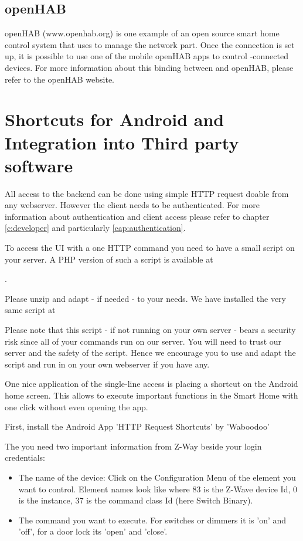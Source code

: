 \subsection{openHAB}

openHAB (www.openhab.org) is one example of an open source smart home control system that 
uses \zway to manage the \zwave network part. Once the connection is set up, it is possible 
to use one of the mobile openHAB apps to control \zway-connected devices. For more information 
about this binding between \zway and openHAB, please refer to the openHAB website.

\section {Shortcuts for Android and Integration into Third party software}

All access to the \zway backend can be done using simple HTTP request doable from any 
webserver. However the client needs to be authenticated. For more information about 
authentication and client access please refer to chapter \ref{c:developer} and 
particularly \ref{cap:authentication}.

To access the UI with a one HTTP command you need to have a small script on your server.
A PHP version of such a script is available at

.

Please unzip and adapt - if needed - to your needs. We have installed the very same script at


Please note that this script - if not running on your own server - bears a security risk 
since all of your commands run on our server. You will need to trust our server and the safety
of the script. Hence we encourage you to use and adapt the script and run in on your own
webserver if you have any.

One nice application of the single-line access is placing a shortcut on the Android 
home screen. This allows to execute important functions in the Smart Home with one click 
without even opening the app.

First, install the Android App 'HTTP Request Shortcuts' by 'Waboodoo'


The you need two important information from Z-Way beside your login credentials:
\begin{itemize}
\item The name of the device: Click on the Configuration Menu of the element you want to 
control. Element names look like  where 83 is the Z-Wave device
Id, 0 is the instance, 37 is the command class Id (here Switch Binary).

\item The command you want to execute. For switches or dimmers it is 'on' and 'off',
for a door lock its 'open' and 'close'. 
\end{itemize}

